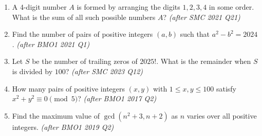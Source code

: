 \documentclass[11pt,a4paper]{article}
\begin{document}
\begin{enumerate}

\item A 4-digit number $A$ is formed by arranging the digits $1, 2, 3, 4$ in some order. What is the sum of all such possible numbers $A$? \textit{\small(after SMC 2021 Q21)}

\item Find the number of pairs of positive integers $(a,b)$ such that $a^2 - b^2 = 2024$. \textit{\small(after BMO1 2021 Q1)}

\item Let $S$ be the number of trailing zeros of $2025!$. What is the remainder when $S$ is divided by $100$? \textit{\small(after SMC 2023 Q12)}

\item How many pairs of positive integers $(x,y)$ with $1 \le x, y \le 100$ satisfy $x^2 + y^2 \equiv 0 \pmod 5$? \textit{\small(after BMO1 2017 Q2)}

\item Find the maximum value of $\gcd(n^2+3, n+2)$ as $n$ varies over all positive integers. \textit{\small(after BMO1 2019 Q2)}

\end{enumerate}

\end{document}
